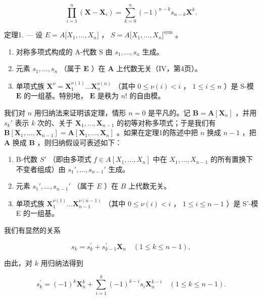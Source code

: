 \[
\prod_ {i = 1} ^ {n} \left(\mathbf {X} - \mathbf {X} _ {i}\right) = \sum_ {k = 0} ^ {n} (- 1) ^ {n - k} s _ {n - k} \mathbf {X} ^ {k}.\tag{4}
\]

定理1. --- 设 \(E = A{[}X_{1}, \ldots, X_{n}{]}\) ， \(S = A{[}X_{1}, \ldots, X_{n}{]}^{\text{sym}}\) 。

\begin{enumerate}
\def\labelenumi{\alph{enumi})}
\item
  对称多项式构成的 A-代数 S 由 \(s_1, \ldots, s_n\) 生成。
\item
  元素 \(s_1, \ldots, s_n\) （属于 \(\mathbf{E}\) ）在 \(\mathbf{A}\) 上代数无关（IV，第4页）。
\item
  单项式族 \(\mathbf{X}^{\nu} = \mathbf{X}_1^{\nu(1)} \ldots \mathbf{X}_n^{\nu(n)}\) （其中 \(0 \leqslant \nu(i) < i\) ， \(1 \leqslant i \leqslant n\) ）是 S-模 \(\mathbf{E}\) 的一组基。特别地， \(\mathbf{E}\) 是秩为 \(n!\) 的自由模。
\end{enumerate}

我们对 \(n\) 用归纳法来证明该定理，情形 \(n = 0\) 是平凡的。记 \(\mathbf{B} = \mathbf{A}[\mathbf{X}_n]\) ，并用 \(s_k'\) 表示 \(k\) 次的、关于 \(\mathbf{X}_1, \ldots, \mathbf{X}_{n-1}\) 的初等对称多项式；于是我们有 \(\mathbf{B}[\mathbf{X}_1, \ldots, \mathbf{X}_{n-1}] = \mathbf{A}[\mathbf{X}_1, \ldots, \mathbf{X}_n]\) 。如果在定理1的陈述中把 \(n\) 换成 \(n-1\) ，把 \(\mathbf{A}\) 换成 \(\mathbf{B}\) ，则归纳假设可表述如下：

\begin{enumerate}
\def\labelenumi{(\Alph{enumi})}
\item
  B-代数 \(S'\) （即由多项式 \(f \in A[X_1, \ldots, X_n]\) 中在 \(X_1, \ldots, X_{n-1}\) 的所有置换下不变者组成）由 \(s_1', \ldots, s_{n-1}'\) 生成。
\item
  元素 \(s_1', \ldots, s_{n-1}'\) （属于 \(E\) ）在 \(B\) 上代数无关。
\item
  单项式族 \(\mathbf{X}_{1}^{\nu(1)}\ldots\mathbf{X}_{n-1}^{\nu(n-1)}\) （其中 \(0\leqslant\nu(i)<i\) ， \(1\leqslant i\leqslant n-1\) ）是 S'-模 E 的一组基。
\end{enumerate}

我们有显然的关系

\[
s _ {k} = s _ {k} ^ {\prime} + s _ {k - 1} ^ {\prime} \mathbf {X} _ {n} \quad (1 \leqslant k \leqslant n - 1),\tag{5}
\]

由此，对 \(k\) 用归纳法得到

\[
s _ {k} ^ {\prime} = (- 1) ^ {k} \mathbf {X} _ {n} ^ {k} + \sum_ {i = 1} ^ {k} (- 1) ^ {k - i} s _ {i} \mathbf {X} _ {n} ^ {k - i} \quad (1 \leqslant k \leqslant n - 1).\tag{6}
\]

